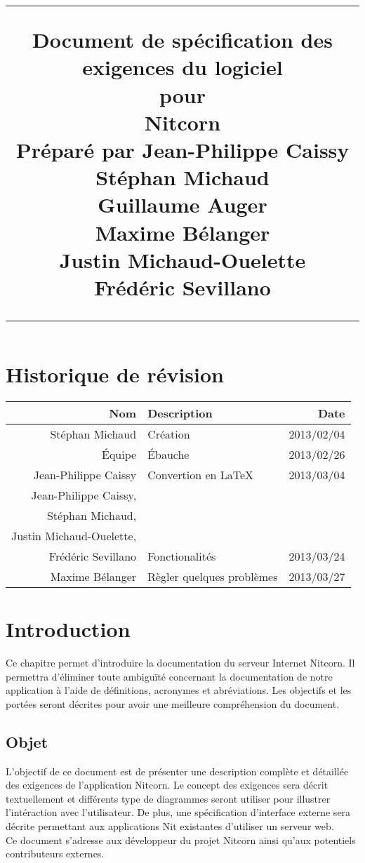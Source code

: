 \documentclass{scrreprt}
\title{%
\flushright
\rule{16cm}{5pt}\vskip1cm
\Huge{Document de spécification des exigences du logiciel}\\
\vspace{2cm}
pour\\
\vspace{2cm}
Nitcorn\\
\vspace{2cm}
Préparé par Jean-Philippe Caissy\\Stéphan Michaud\\Guillaume Auger\\Maxime
Bélanger\\Justin Michaud-Ouelette\\Frédéric Sevillano\\
\vfill
\rule{16cm}{5pt}
}
\date{}
\begin{document}
\maketitle
\tableofcontents
\chapter*{Historique de révision}
\begin{tabularx}{\textwidth}{|r|X|r|}
    \hline
    Nom & Description & Date \\
    \hline
    Stéphan Michaud & Création & 2013/02/04 \\
    \hline
    Équipe & Ébauche & 2013/02/26 \\
    \hline
    Jean-Philippe Caissy & Convertion en \LaTeX & 2013/03/04 \\
    \hline
    Jean-Philippe Caissy,\\Stéphan Michaud,\\Justin Michaud-Ouelette,\\Frédéric Sevillano & Fonctionalités & 2013/03/24 \\
    \hline
    Maxime Bélanger & Règler quelques problèmes & 2013/03/27
\end{tabularx}

\chapter{Introduction}
Ce chapitre permet d'introduire la documentation du serveur Internet Nitcorn. Il permettra d'éliminer toute ambiguïté concernant la documentation
de notre application à l'aide de définitions, acronymes et
abréviations. Les objectifs et les portées seront décrites pour
avoir une meilleure compréhension du document.
\section{Objet}
L'objectif de ce document est de présenter une description complète et
détaillée des exigences de l'application Nitcorn. Le concept des exigences sera décrit textuellement et différents type de diagrammes seront utiliser pour illustrer  l'intéraction avec l'utilisateur. De plus, une spécification d'interface externe sera décrite permettant aux applications Nit existantes d'utiliser un serveur web.\\

Ce document s'adresse aux développeur du projet Nitcorn ainsi qu'aux potentiels
contributeurs externes.
\end{document}
